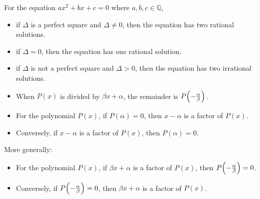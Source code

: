 \documentclass[12pt,a4paper,titlepage]{article}
\DeclarePairedDelimiter {\pars}  {  (      }     {  )      }
\begin{document}
\begin{SummaryBox}[title=Quadratics]
\begin{itemize}[leftmargin=*]
\begin{itemize}[topsep=0pt]
\begin{itemize}[topsep=0pt]
                        \end{itemize}
                        For the equation $ax^2 + bx + c = 0$ where $a,b,c \in \mathbb{Q}$,
                        \begin{itemize}[topsep=0pt]
                            \item if $\Delta$ is a perfect square and $\Delta \neq 0$, then the equation has two rational solutions.
                            \item if $\Delta = 0$, then the equation has one rational solution.
                            \item if $\Delta$ is not a perfect square and $\Delta > 0$, then the equation has two irrational solutions.
                        \end{itemize}
                    \end{itemize}
                \end{itemize}
            \end{SummaryBox}
            
            \begin{SummaryBox}[title=Remainder theorem]
                \begin{itemize}[leftmargin=*]
                    \item When $P(x)$ is divided by $\beta x + \alpha$, the remainder is $P\pars*{-\frac{\alpha}{\beta}}$.
                \end{itemize}
            \end{SummaryBox}
            
            \begin{SummaryBox}[title=Factor theorem]
                \begin{itemize}[leftmargin=*]
                    \item For the polynomial $P(x)$, if $P(\alpha) = 0$, then $x-\alpha$ is a factor of $P(x)$.
                    \item Conversely, if $x-\alpha$ is a factor of $P(x)$, then $P(\alpha) = 0$.
                \end{itemize}
                
                More generally:
                \begin{itemize}[leftmargin=*]
                    \item For the polynomial $P(x)$, if $\beta x + \alpha$ is a factor of $P(x)$, then $P\pars*{-\frac{\alpha}{\beta}} = 0$.
                    \item Conversely, if $P\pars*{-\frac{\alpha}{\beta}} = 0$, then $\beta x + \alpha$ is a factor of $P(x)$.
                \end{itemize}
            \end{SummaryBox}
            
\end{document}
